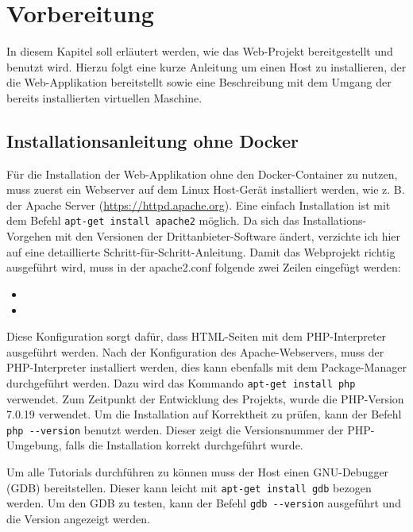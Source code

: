\chapter{Vorbereitung}
In diesem Kapitel soll erläutert werden, wie das Web-Projekt bereitgestellt und benutzt wird. Hierzu folgt eine kurze Anleitung um einen Host zu installieren, der die Web-Applikation bereitstellt sowie eine Beschreibung mit dem Umgang der bereits installierten virtuellen Maschine.

\section{Installationsanleitung ohne Docker}
\label{secInstall}

Für die Installation der Web-Applikation ohne den Docker-Container zu nutzen, muss zuerst ein Webserver auf dem Linux Host-Gerät installiert werden, wie z. B. der Apache Server (\url{https://httpd.apache.org}). Eine einfach Installation ist mit dem Befehl \colorbox{altgray}{\lstinline|apt-get install apache2|} möglich. Da sich das Installations-Vorgehen mit den Versionen der Drittanbieter-Software ändert, verzichte ich hier auf eine detaillierte Schritt-für-Schritt-Anleitung. Damit das Webprojekt richtig ausgeführt wird, muss in der apache2.conf folgende zwei Zeilen eingefügt werden:\medskip

\begin{itemize}
	\item {}
	\item {}\medskip
\end{itemize}
	
Diese Konfiguration sorgt dafür, dass HTML-Seiten mit dem PHP-Interpreter ausgeführt werden. Nach der Konfiguration des Apache-Webservers, muss der PHP-Interpreter installiert werden, dies kann ebenfalls mit dem Package-Manager durchgeführt werden. Dazu wird das Kommando \colorbox{altgray}{\lstinline|apt-get install php|} verwendet. Zum Zeitpunkt der Entwicklung des Projekts, wurde die PHP-Version 7.0.19 verwendet. Um die Installation auf Korrektheit zu prüfen, kann der Befehl \colorbox{altgray}{\lstinline|php --version|} benutzt werden. Dieser zeigt die Versionsnummer der PHP-Umgebung, falls die Installation korrekt durchgeführt wurde.\medskip

Um alle Tutorials durchführen zu können muss der Host einen GNU-Debugger (GDB) bereitstellen. Dieser kann leicht mit  \colorbox{altgray}{\lstinline|apt-get install gdb|} bezogen werden. Um den GDB zu testen, kann der Befehl \colorbox{altgray}{\lstinline|gdb --version|} ausgeführt und die Version angezeigt werden.\medskip

